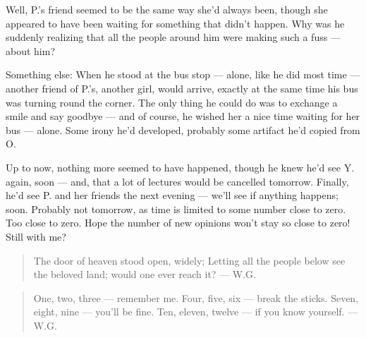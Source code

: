 Well, P.'s friend seemed to be the same way she'd always been, though she appeared to have been waiting for something that didn't happen. Why was he suddenly realizing that all the people around him were making such a fuss --- about him?

Something else: When he stood at the bus stop --- alone, like he did most time --- another friend of P.'s, another girl, would arrive, exactly at the same time his bus was turning round the corner. The only thing he could do was to exchange a smile and say goodbye --- and of course, he wished her a nice time waiting for her bus --- alone. 
Some irony he'd developed, probably some artifact he'd copied from O.

Up to now, nothing more seemed to have happened, though he knew he'd see Y. again, soon --- and, that a lot of lectures would be cancelled tomorrow. 
Finally, he'd see P. and her friends the next evening --- we'll see if anything happens; soon. 
Probably not tomorrow, as time is limited to some number close to zero.
Too close to zero. 
Hope the number of new opinions won't stay so close to zero!
Still with me?

\begin{verse}
The door of heaven stood open, 
widely; 
Letting all the people below 
see the beloved land; 
would one ever reach it? 
--- W.G.
\end{verse}

\begin{verse}
One, two, three --- 
remember me. 
Four, five, six --- 
break the sticks. 
Seven, eight, nine --- 
you'll be fine. 
Ten, eleven, twelve --- 
if you know yourself. 
--- W.G.
\end{verse}

